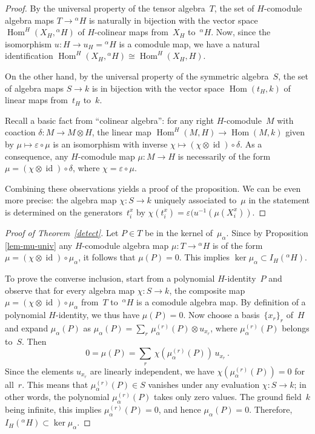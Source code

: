 \documentclass[11pt, a4paper]{amsart}
\theoremstyle{definition}
\numberwithin{equation}{section}
\begin{document}
\begin{proof}
By the universal property of the tensor algebra~$T$,
the set of $H$-comodule algebra maps $T \to {}^{\alpha} H$ is naturally in bijection
with the vector space $\operatorname{Hom}^H(X_H,{}^{\alpha} H)$ of $H$-colinear maps from~$X_H$ to~${}^{\alpha} H$.
Now, since the isomorphism $u: H \to u_H = {}^{\alpha} H$ is a comodule map, we have a natural identification
$\operatorname{Hom}^H(X_H,{}^{\alpha} H) \cong \operatorname{Hom}^H(X_H,H)$.

On the other hand, by the universal property of the symmetric algebra~$S$, the set of algebra maps $S \to k$ is in bijection
with the vector space $\operatorname{Hom}(t_H,k)$ of linear maps from~$t_H$ to~$k$.

Recall a basic fact from ``colinear algebra'': for any right $H$-comodule~$M$ with coaction $\delta: M \to M \otimes H$,
the linear map $\operatorname{Hom}^H(M,H) \to \operatorname{Hom}(M,k)$ given by $\mu \mapsto {\varepsilon} \circ \mu$ is an isomorphism
with inverse $\chi \mapsto (\chi \otimes \operatorname{id}) \circ \delta$.
As a consequence, any $H$-comodule map $\mu : M \to H$ is necessarily 
of the form $\mu = (\chi \otimes \operatorname{id}) \circ \delta$, where $\chi = {\varepsilon} \circ \mu$.

Combining these observations yields a proof of the proposition.
We can be even more precise: the algebra map $\chi : S \to k$ uniquely associated to~$\mu$ 
in the statement is determined on the generators~$t_i^x$ by $\chi(t_i^x) = {\varepsilon} (u^{-1}(\mu(X_i^x))$.
\end{proof}

\begin{proof}[Proof of Theorem~\ref{detect}]
Let $P \in T$ be in the kernel of~$\mu_{\alpha}$. Since by Proposition\,\ref{lem-mu-univ}
any $H$-comodule algebra map $\mu : T \to {}^{\alpha} H$ is of the form
$\mu = (\chi \otimes \operatorname{id}) \circ \mu_{\alpha}$, it follows that $\mu(P)=0$.
This implies $\ker \mu_{\alpha} \subset I_H({}^{\alpha} H)$.

To prove the converse inclusion, start from a polynomial $H$-identity~$P$
and observe that for every algebra map  $\chi : S \to k$, 
the composite map $\mu = (\chi \otimes \operatorname{id}) \circ \mu_{\alpha}$
from~$T$ to~${}^{\alpha} H$ is a comodule algebra map. 
By definition of a polynomial $H$-identity, we thus have $\mu(P)= 0$.
Now choose a basis~$\{x_r\}_r$ of~$H$ and expand $\mu_{\alpha}(P)$ as
$\mu_{\alpha}(P) = \sum_r \, \mu^{(r)}_{\alpha}(P) \otimes u_{x_r}$,
where $\mu^{(r)}_{\alpha}(P)$ belongs to~$S$. Then 
\begin{equation*}
0 = \mu(P) = \sum_r \, \chi(\mu^{(r)}_{\alpha}(P)) \,u_{x_r} \, .
\end{equation*}
Since the elements $u_{x_r}$ are linearly independent, we have $\chi(\mu^{(r)}_{\alpha}(P)) = 0$ for all~$r$.
This means that $\mu^{(r)}_{\alpha}(P) \in S$ vanishes under any evaluation $\chi : S \to k$;
in other words, the polynomial $\mu^{(r)}_{\alpha}(P)$ takes only zero values. 
The ground field~$k$ being infinite, this implies $\mu^{(r)}_{\alpha}(P) = 0$, and hence $\mu_{\alpha}(P) = 0$.
Therefore, $I_H({}^{\alpha} H) \subset \ker \mu_{\alpha}$.
\end{proof}
\end{document}
